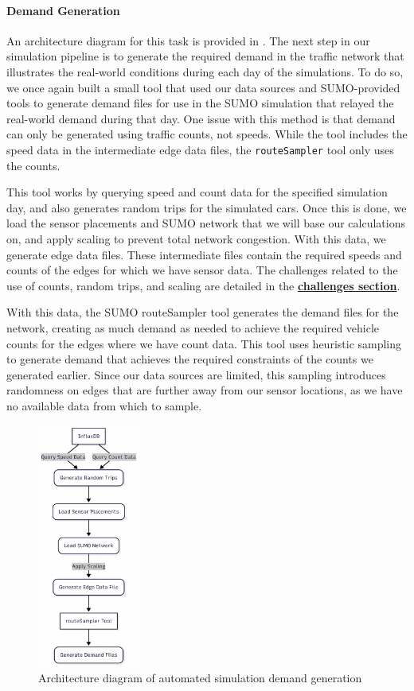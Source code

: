 \paragraph{Demand Generation}
An architecture diagram for this task is provided in . The next step in our simulation pipeline is to generate the required demand in the traffic network that illustrates the real-world conditions during each day of the simulations. To do so, we once again built a small tool that used our data sources and SUMO-provided tools to generate demand files for use in the SUMO simulation that relayed the real-world demand during that day. One issue with this method is that demand can only be generated using traffic counts, not speeds. While the tool includes the speed data in the intermediate edge data files, the \verb|routeSampler| tool only uses the counts.

This tool works by querying speed and count data for the specified simulation day, and also generates random trips for the simulated cars. Once this is done, we load the sensor placements and SUMO network that we will base our calculations on, and apply scaling to prevent total network congestion. With this data, we generate edge data files. These intermediate files contain the required speeds and counts of the edges for which we have sensor data. The challenges related to the use of counts, random trips, and scaling are detailed in the \textbf{\hyperref[link:trip-info]{challenges section}}.

With this data, the SUMO routeSampler tool \cite{noauthor_turns_nodate} generates the demand files for the network, creating as much demand as needed to achieve the required vehicle counts for the edges where we have count data. This tool uses heuristic sampling to generate demand that achieves the required constraints of the counts we generated earlier. Since our data sources are limited, this sampling introduces randomness on edges that are further away from our sensor locations, as we have no available data from which to sample.

\begin{figure}[!ht]
  \centering
  \includegraphics[width=0.3\textwidth]{images/design-implementation/generate-demand.pdf}
  \caption{Architecture diagram of automated simulation demand generation}
  \label{fig:demand-conversion}
\end{figure}

